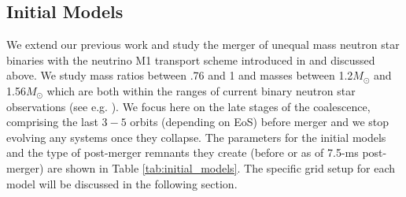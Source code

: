






\subsection{Initial Models}
\label{sec:initial_models}
We extend our previous work \cite{foucart:2015gaa} and study the merger
of unequal mass neutron star binaries with the neutrino M1 transport scheme introduced in \cite{foucart2016impact} and discussed above. We study mass ratios between .76 and 1 and masses between 1.2$M_\odot$ and 1.56$M_\odot$ which are both within the ranges of current binary neutron star observations (see e.g. \cite{lattimer:2012nd}). We focus here on the late stages of the coalescence, comprising the last $3-5$ orbits (depending on EoS) before merger and we stop evolving any systems once they collapse. The parameters for the initial models and the type of post-merger remnants they create (before or as of 7.5-ms post-merger) are shown in Table \ref{tab:initial_models}. The specific grid setup for each model will be discussed in the following section.

